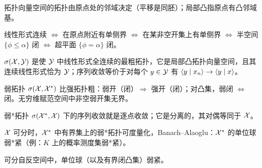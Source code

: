 \begin{keypoints}
  \item 拓扑向量空间的拓扑由原点处的邻域决定（平移是同胚）；局部凸指原点有凸邻域基。
  \item 线性形式连续 $\iff$ 在原点附近有单侧界 $\iff$ 在某非空开集上有单侧界 $\iff$ 半空间 $\{\phi\leqslant\alpha\}$ 闭 $\iff$ 超平面 $\{\phi=\alpha\}$ 闭。
  \item $\sigma(\mathcal{X},\mathcal{Y})$ 是使 $\mathcal{Y}$ 中线性形式全连续的最粗拓扑，它是局部凸拓扑向量空间，且其连续线性形式恰为 $\mathcal{Y}$；序列收敛等价于对每个 $y\in\mathcal{Y}$ 有 $\langle y \mid x_n\rangle\to\langle y \mid x\rangle$。
  \item 弱拓扑 $\sigma(\mathcal{X},\mathcal{X}^{*})$ 比强拓扑粗：弱开（闭）$\Rightarrow$ 强开（闭）；对凸集，弱闭 $\iff$ 闭。无穷维赋范空间中非空弱开集无界。
  \item 弱*拓扑 $\sigma(\mathcal{X}^{*},\mathcal{X})$ 下的序列收敛就是逐点收敛；它是分离的，其对偶等同于 $\mathcal{X}$。
  \item $\mathcal{X}$ 可分时，$\mathcal{X}^{*}$ 中有界集上的弱*拓扑可度量化，Banach--Alaoglu：$\mathcal{X}^{*}$ 的单位球弱*紧（例：$K$ 上的概率测度集弱*紧）。
  \item 可分自反空间中，单位球（以及有界闭凸集）弱紧。
\end{keypoints}
